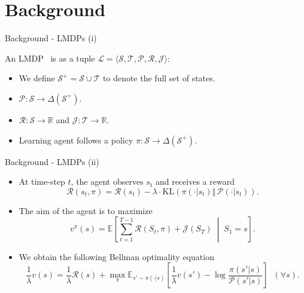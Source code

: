 \documentclass{beamer}
\theoremstyle{mystyle}
\newcommand{\cJ}{\mathcal{J}}
\newcommand{\cL}{\mathcal{L}}
\newcommand{\cP}{\mathcal{P}}
\newcommand{\cR}{\mathcal{R}}
\newcommand{\cS}{\mathcal{S}}
\newcommand{\cT}{\mathcal{T}}
\newcommand{\EEc}[2]{\mathbb{E}\left[#1\;\middle\lvert\;#2\right]}
\newcommand{\real}{\mathbb{R}}
\begin{document}
\section{Background}
\begin{frame}{Background - LMDPs (i)}

    An LMDP~\citep{KappenML2012,TodorovNIPS2007} is as a tuple $\cL=\langle\cS,\cT,\cP,\cR,\cJ\rangle$:
    
    \begin{itemize}
        \item We define $\cS^+=\cS\cup\cT$ to denote the full set of states.
        \item $\cP:\cS\rightarrow\Delta(\cS^+)$. %
        \item $\cR:\cS\rightarrow\real$ and $\cJ:\cT\rightarrow\real$.
        \item Learning agent follows a policy $\pi:\cS\rightarrow\Delta(\cS^+)$.
    \end{itemize}
    
    
\end{frame}

\begin{frame}{Background - LMDPs (ii)}
    
    \begin{itemize}

        \item At time-step $t$, the agent observes $s_t$ and receives a reward \[ \cR(s_t,\pi) = \cR(s_t) - \lambda\cdot\mathrm{KL}(\pi(\cdot|s_t)\Vert\, \cP(\cdot|s_t)). \]
        \item The aim of the agent is to maximize \[ v^\pi(s) = \EEc{\sum_{t=1}^{T-1} \cR(S_t,\pi) + \cJ(S_T)}{S_1 = s}.\]        
       \item We obtain the following Bellman optimality equation 
       \begin{equation*}
            \frac 1 \lambda v(s) = \frac 1 \lambda \cR(s) + \max_\pi \mathbb{E}_{s'\sim\pi(\cdot|s)} \left[ \frac 1 \lambda v(s') - \log \frac {\pi(s'|s)} {\cP(s'|s)} \right] \;\; (\forall s).
        \end{equation*}

    \end{itemize}
\end{frame}
\end{document}

